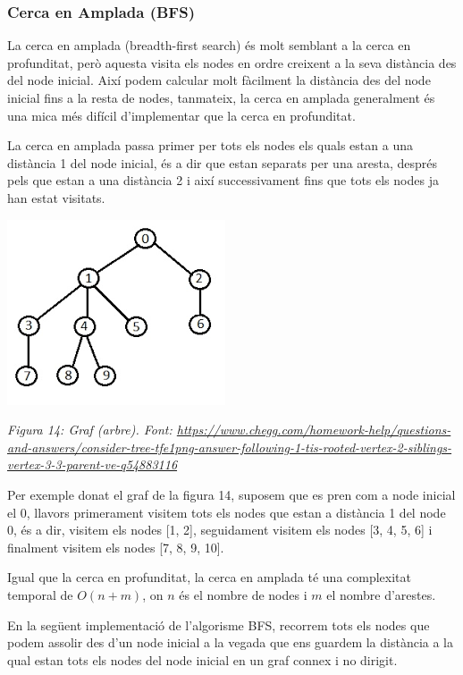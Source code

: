 \subsubsection{Cerca en Amplada (BFS)}

La cerca en amplada (breadth-first search) és molt semblant a la cerca en profunditat, però aquesta visita els nodes en ordre creixent a la seva distància des del node inicial. Així podem calcular molt fàcilment la distància des del node inicial fins a la resta de nodes, tanmateix, la cerca en amplada generalment és una mica més difícil d'implementar que la cerca en profunditat.

La cerca en amplada passa primer per tots els nodes els quals estan a una distància 1 del node inicial, és a dir que estan separats per una aresta, després pels que estan a una distància 2 i així successivament fins que tots els nodes ja han estat visitats.

\begin{center}
    \includegraphics[width=.4 \textwidth]{TreeRoot.png}
    
    \caption{\emph{Figura 14: Graf (arbre). Font: \url{https://www.chegg.com/homework-help/questions-and-answers/consider-tree-tfe1png-answer-following-1-tis-rooted-vertex-2-siblings-vertex-3-3-parent-ve-q54883116}}}
\end{center}

Per exemple donat el graf de la figura 14, suposem que es pren com a node inicial el 0, llavors primerament visitem tots els nodes que estan a distància 1 del node 0, és a dir, visitem els nodes [1, 2], seguidament visitem els nodes [3, 4, 5, 6] i finalment visitem els nodes [7, 8, 9, 10].

Igual que la cerca en profunditat, la cerca en amplada té una complexitat temporal de $O(n + m)$, on $n$ és el nombre de nodes i $m$ el nombre d'arestes. \newline

En la següent implementació de l'algorisme BFS, recorrem tots els nodes que podem assolir des d'un node inicial a la vegada que ens guardem la distància a la qual estan tots els nodes del node inicial en un graf connex i no dirigit. \newpage


